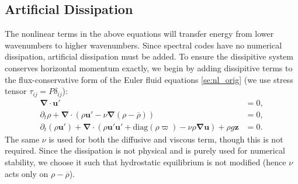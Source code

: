 \documentclass[
        fleqn,
        usenatbib,
    ]{mnras}
\newcommand*{\p}[1]{\left(#1\right)}
\newcommand*{\bm}[1]{\boldsymbol{\mathbf{#1}}}
\begin{document}
\subsection{Artificial Dissipation}

The nonlinear terms in the above equations will transfer energy from lower
wavenumbers to higher wavenumbers. Since spectral codes have no numerical
dissipation, artificial dissipation must be added. To ensure the dissipitive
system conserves horizontal momentum exactly, we begin by adding dissipitive
terms to the flux-conservative form of the Euler fluid equations
\autoref{se:nl_orig} (we use stress tensor $\tau_{ij} = P\delta_{ij}$):
\begin{subequations}
    \begin{align}
        \bm{\nabla} \cdot \bm{u}' &= 0,\\
        \partial_t \rho + \bm{\nabla} \cdot (\rho \bm{u}' - \nu
            \bm{\nabla}(\rho - \overline{\rho})) &= 0,\label{eq:visc_cons_mom}\\
        \partial_t (\rho \bm{u}') + \bm{\nabla} \cdot (\rho \bm{u}' \bm{u}'
            + \mathrm{diag}(\rho \varpi)
            - \nu \rho \bm{\nabla}\bm{u})
            + \rho g \bm{z} &= 0.
    \end{align}
\end{subequations}
The same $\nu$ is used for both the diffusive and viscous term, though this is
not required. Since the dissipation is not physical and is purely used for
numerical stability, we choose it such that hydrostatic equilibrium is not
modified (hence $\nu$ acts only on $\rho - \overline{\rho}$).
\end{document}
